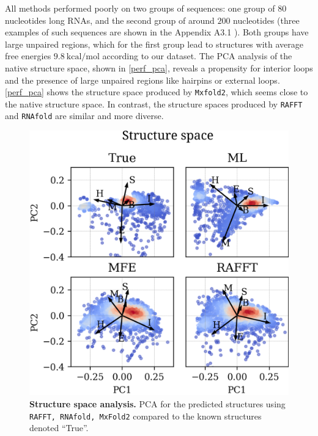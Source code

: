 All methods performed poorly on two groups of sequences: one group of $80$ nucleotides long RNAs, and the second group of around $200$ nucleotides (three examples of such sequences are shown in the Appendix A3.1 ). Both groups have large unpaired regions, which for the first group lead to structures with average free energies $9.8\ \textrm{kcal/mol}$ according to our dataset. The \ac{PCA} analysis of the native structure space, shown in \autoref{perf_pca}, reveals a propensity for interior loops and the presence of large unpaired regions like hairpins or external loops. \autoref{perf_pca} shows the structure space produced by \texttt{Mxfold2}, which seems close to the native structure space. In contrast, the structure spaces produced by \texttt{RAFFT} and \texttt{RNAfold} are similar and more diverse.
\begin{figure}[t!]
	\centering
	\includegraphics[width=.9\linewidth]{../res/images/rafft/perf_pca.png}
	\caption{\label{perf_pca} \textbf{Structure space analysis.} \ac{PCA} for the
		predicted structures using \texttt{RAFFT, RNAfold, MxFold2} compared to the
		known structures denoted ``True''.}
\end{figure}
